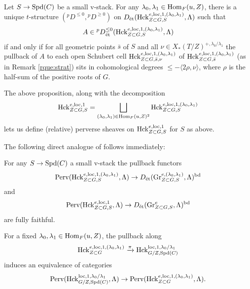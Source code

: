  \begin{prop}
     Let $S \to \mathrm{Spd}(C)$ be a small v-stack. For any $\lambda_{0},\lambda_{1} \in \mathrm{Hom}_{F}(u,Z)$, there is a unique $t$-structure $({^{p}}D^{\leq0},{^{p}D}^{\geq 0})$ on $D_{\textnormal{\'{e}t}}(\mathrm{Hck}_{Z \subset G,S}^{e,\mathrm{loc},1,(\lambda_{0},\lambda_{1})},\Lambda)$ such that 
     \begin{equation*}
     A \in {^{p}D}^{\leq 0}_{\textnormal{\'{e}t}}(\mathrm{Hck}_{Z \subset G,S}^{e,\mathrm{loc},1,(\lambda_{0},\lambda_{1})},\Lambda)
     \end{equation*}
     if and only if for all geometric points $\bar{s}$ of $S$ and all $\nu \in X_{*}(T/Z)^{+,\lambda_{0}/\lambda_{1}}$ the pullback of $A$ to each open Schubert cell $\mathrm{Hck}_{Z \subset G,\bar{s},\nu}^{e,\mathrm{loc},1,(\lambda_{0},\lambda_{1})}$ of $\mathrm{Hck}_{Z \subset G,\bar{s}}^{e,\mathrm{loc},1,(\lambda_{0},\lambda_{1})}$ (as in Remark \ref{rque:strat}) sits in cohomological degrees $\leq - \langle 2\rho, \nu \rangle$, where $\rho$ is the half-sum of the positive roots of $G$.
 \end{prop}

 The above proposition, along with the decomposition 
 \begin{equation*}
 \mathrm{Hck}_{Z \subset G,S}^{e,\mathrm{loc},1} = \bigsqcup_{(\lambda_{0},\lambda_{1}) \in \mathrm{Hom}_{F}(u,Z)^{2}}\mathrm{Hck}_{Z \subset G,S}^{e,\mathrm{loc},1,(\lambda_{0},\lambda_{1})}
 \end{equation*}
 lets us define (relative) perverse sheaves on  $\mathrm{Hck}_{Z \subset G,S}^{e,\mathrm{loc},1}$ for $S$ as above.

The following direct analogue of \cite[Proposition VI.7.2]{Geometrization} follows immediately:
 \begin{prop}\label{prop:FSVI.7.2}
 For any $S \to \mathrm{Spd}(C)$ a small v-stack the pullback functors 
 \begin{equation*}
 \textnormal{Perv}(\mathrm{Hck}_{Z \subset G,S}^{e,\mathrm{loc},1,(\lambda_{0},\lambda_{1})},\Lambda) \to D_{\textnormal{\'{e}t}}(\textnormal{Gr}_{Z \subset G,S}^{e,(\lambda_{0},\lambda_{1})},\Lambda)^{\textnormal{bd}}
\end{equation*}
and
\begin{equation*}
 \textnormal{Perv}(\mathrm{Hck}_{Z \subset G,S}^{e,\mathrm{loc},1},\Lambda) \to D_{\textnormal{\'{e}t}}(\textnormal{Gr}_{Z \subset G,S}^{e},\Lambda)^{\textnormal{bd}}
\end{equation*}
are fully faithful.
 \end{prop}

     \begin{corol}\label{prop:perveequiv1}
For a fixed $\lambda_{0}, \lambda_{1} \in \mathrm{Hom}_{F}(u,Z)$, the pullback along
\begin{equation*}
\mathrm{Hck}^{e,\mathrm{loc},1,(\lambda_{0},\lambda_{1})}_{Z \subset G} \xrightarrow{\pi} \mathrm{Hck}^{\mathrm{loc},1,\lambda_{0}/
\lambda_{1}}_{G/Z,\mathrm{Spd}(C)}
\end{equation*}
induces an equivalence of categories
\begin{equation}\label{eq:pervequivbis}
    \textnormal{Perv}(\mathrm{Hck}^{\mathrm{loc},1,\lambda_{0}/
\lambda_{1}}_{G/Z,\mathrm{Spd}(C)},\Lambda) \to \textnormal{Perv}(\mathrm{Hck}^{e,\mathrm{loc},1,(\lambda_{0},\lambda_{1})}_{Z \subset G},\Lambda).
\end{equation}
\end{corol}

